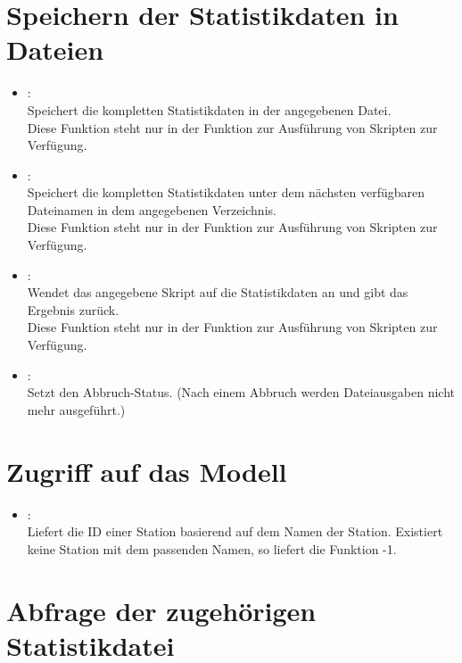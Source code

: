 \section{Speichern der Statistikdaten in Dateien}

\begin{itemize}

\item
{}:\\
Speichert die kompletten Statistikdaten in der angegebenen Datei.\\
Diese Funktion steht nur in der Funktion zur Ausführung von Skripten zur Verfügung.

\item
{}:\\
Speichert die kompletten Statistikdaten unter dem nächsten verfügbaren Dateinamen in dem angegebenen Verzeichnis.\\
Diese Funktion steht nur in der Funktion zur Ausführung von Skripten zur Verfügung.

\item
{}:\\
Wendet das angegebene Skript auf die Statistikdaten an und gibt das Ergebnis zurück.\\
Diese Funktion steht nur in der Funktion zur Ausführung von Skripten zur Verfügung.

\item
{}:\\
Setzt den Abbruch-Status. (Nach einem Abbruch werden Dateiausgaben nicht mehr ausgeführt.)

\end{itemize}

\section{Zugriff auf das Modell}

\begin{itemize}

\item
{}:\\
Liefert die ID einer Station basierend auf dem Namen der Station.
Existiert keine Station mit dem passenden Namen, so liefert die Funktion -1.

\end{itemize}

\section{Abfrage der zugehörigen Statistikdatei}

